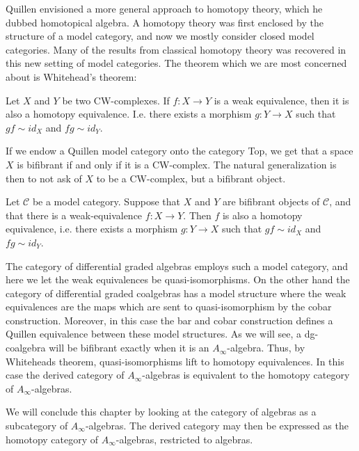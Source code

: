 \documentclass[../thesis.tex]{subfiles}
\begin{document}
        Quillen envisioned a more general approach to homotopy theory, which he dubbed homotopical algebra. A homotopy theory was first enclosed by the structure of a model category, and now we mostly consider closed model categories. Many of the results from classical homotopy theory was recovered in this new setting of model categories. The theorem which we are most concerned about is Whitehead's theorem:

        \begin{thm}
            Let $X$ and $Y$ be two CW-complexes. If $f:X\rightarrow Y$ is a weak equivalence, then it is also a homotopy equivalence. I.e. there exists a morphism $g: Y\rightarrow X$ such that $gf\sim id_X$ and $fg\sim id_Y$.
        \end{thm}

        If we endow a Quillen model category onto the category Top, we get that a space $X$ is bifibrant if and only if it is a CW-complex. The natural generalization is then to not ask of $X$ to be a CW-complex, but a bifibrant object.

        \begin{thm}
            Let $\mathcal{C}$ be a model category. Suppose that $X$ and $Y$ are bifibrant objects of $\mathcal{C}$, and that there is a weak-equivalence $f:X\rightarrow Y$. Then $f$ is also a homotopy equivalence, i.e. there exists a morphism $g: Y\rightarrow X$ such that $gf\sim id_X$ and $fg\sim id_Y$.
        \end{thm}

        The category of differential graded algebras employs such a model category, and here we let the weak equivalences be quasi-isomorphisms. On the other hand the category of differential graded coalgebras has a model structure where the weak equivalences are the maps which are sent to quasi-isomorphism by the cobar construction. Moreover, in this case the bar and cobar construction defines a Quillen equivalence between these model structures. As we will see, a dg-coalgebra will be bifibrant exactly when it is an $A_\infty$-algebra. Thus, by Whiteheads theorem, quasi-isomorphisms lift to homotopy equivalences. In this case the derived category of $A_\infty$-algebras is equivalent to the homotopy category of $A_\infty$-algebras.

        We will conclude this chapter by looking at the category of algebras as a subcategory of $A_\infty$-algebras. The derived category may then be expressed as the homotopy category of $A_\infty$-algebras, restricted to algebras.
\end{document}
